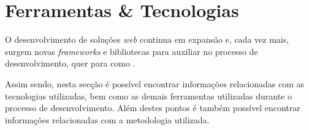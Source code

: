 \chapter{Ferramentas \& Tecnologias}

O desenvolvimento de soluções \textit{web} continua em expansão e, cada vez mais, surgem novas \textit{frameworks} e bibliotecas para auxiliar no processo de desenvolvimento, quer para \textit{} como \textit{}.

Assim sendo, nesta secção é possível encontrar informações relacionadas com as tecnologias utilizadas, bem como as demais ferramentas utilizadas durante o processo de desenvolvimento. Além destes pontos é também possível encontrar informações relacionadas com a metodologia utilizada.







